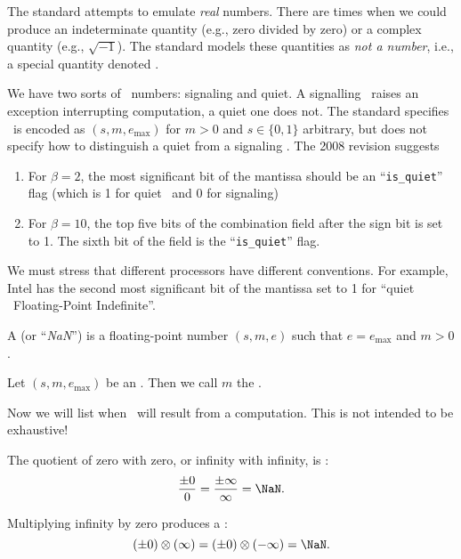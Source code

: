 The  standard attempts to emulate \emph{real} numbers. There
are times when we could produce an indeterminate quantity (e.g., zero divided
by zero) or a complex quantity (e.g., $\sqrt{-1}$). The standard models
these quantities as \emph{not a number}, i.e., a special quantity
denoted \NaN.

We have two sorts of \NaN\ numbers: signaling and quiet. A signalling
\NaN\ raises an exception interrupting computation, a quiet one does
not. The  standard specifies \NaN\ is encoded as $(s,m,e_{\text{max}})$
for $m>0$ and $s\in\{0,1\}$ arbitrary, but does not specify how to
distinguish a quiet from a signaling \NaN. The 2008 revision suggests
\begin{enumerate}
\item For $\beta=2$, the most significant bit of the mantissa should be an
  ``\verb|is_quiet|'' flag (which is 1 for quiet \NaN\ and 0 for signaling)
\item For $\beta=10$, the top five bits of the combination field after
  the sign bit is set to 1. The sixth bit of the field is the ``\verb|is_quiet|''
  flag.
\end{enumerate}
We must stress that different processors have different conventions. For
example, Intel has the second most significant bit of the mantissa set
to 1 for ``quiet \NaN\ Floating-Point Indefinite''.

\begin{defn}
  A  (or ``\emph{NaN}'') is a floating-point number
  $(s,m,e)$ such that $e=e_{\text{max}}$ and $m>0$.
\end{defn}

\begin{defn}
  Let $(s,m,e_{\text{max}})$ be an \NaN. Then we call $m$ the .
\end{defn}

Now we will list when \NaN\ will result from a computation. This is not
intended to be exhaustive!

\begin{axiom}
  The quotient of zero with zero, or infinity with infinity, is \NaN:
  \begin{equation}
    \frac{\pm0}{0} = \frac{\pm \infty}{\infty} = \NaN.
  \end{equation}
\end{axiom}

\begin{axiom}
  Multiplying infinity by zero produces a \NaN:
  \begin{equation}
    (\pm 0)\otimes(\infty)=(\pm0)\otimes(-\infty)=\NaN.
  \end{equation}
\end{axiom}

